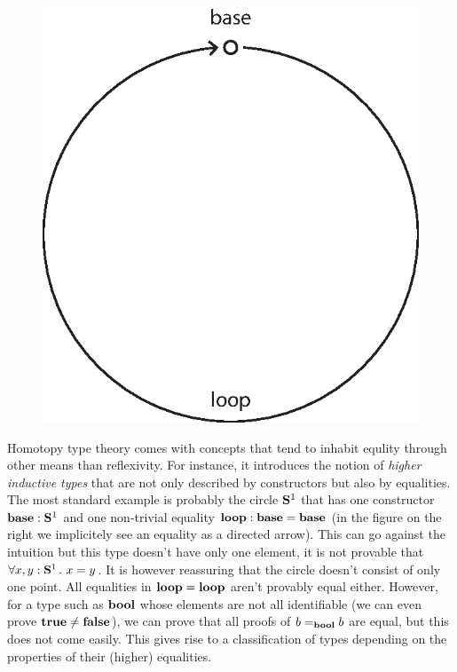 \documentclass[11pt]{article}
\theoremstyle{plain}
\theoremstyle{remark}
\begin{document}
\begin{figure}
    \centering
    \includegraphics[scale=.4]{s1.eps}
\end{figure}
Homotopy type theory comes with concepts that tend to inhabit equlity through
other means than reflexivity. For instance, it introduces the notion of
\emph{higher inductive types} that are not only described by constructors but
also by equalities.
The most standard example is probably the circle $\S1$ that has one constructor
$\base : \S1$ and one non-trivial equality $\operatorname{\mathbf{loop}} : \operatorname{\mathbf{base}} = \operatorname{\mathbf{base}}$
(in the figure on the right we implicitely see an equality as a directed arrow).
This can go against the intuition but this type doesn't have only one element,
\ie it is not provable that $\forall x,y : \S1.\ x = y$. It is however
reassuring that the circle doesn't consist of only one point.
All equalities in $\operatorname{\mathbf{loop}} = \operatorname{\mathbf{loop}}$ aren't provably equal either.
However, for a type such as $\operatorname{\mathbf{bool}}$ whose elements are not all
identifiable (we can even prove $\operatorname{\mathbf{true}} \neq \operatorname{\mathbf{false}}$), we can prove that all
proofs of $b =_{\operatorname{\mathbf{bool}}} b$ are equal, but this does not come easily.
This gives rise to a classification of types depending on the properties
of their (higher) equalities.
\end{document}
